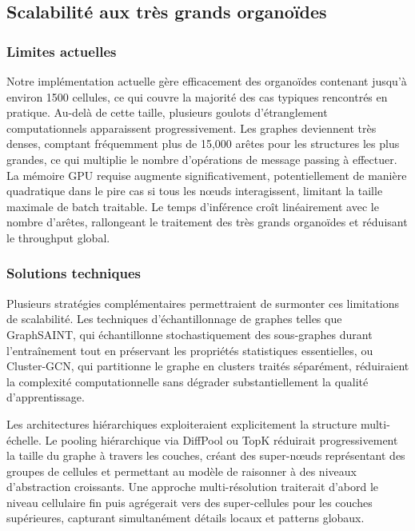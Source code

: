 \subsection{Scalabilité aux très grands organoïdes}

\subsubsection{Limites actuelles}

Notre implémentation actuelle gère efficacement des organoïdes contenant jusqu'à environ 1500 cellules, ce qui couvre la majorité des cas typiques rencontrés en pratique. Au-delà de cette taille, plusieurs goulots d'étranglement computationnels apparaissent progressivement. Les graphes deviennent très denses, comptant fréquemment plus de 15,000 arêtes pour les structures les plus grandes, ce qui multiplie le nombre d'opérations de message passing à effectuer. La mémoire GPU requise augmente significativement, potentiellement de manière quadratique dans le pire cas si tous les nœuds interagissent, limitant la taille maximale de batch traitable. Le temps d'inférence croît linéairement avec le nombre d'arêtes, rallongeant le traitement des très grands organoïdes et réduisant le throughput global.

\subsubsection{Solutions techniques}

Plusieurs stratégies complémentaires permettraient de surmonter ces limitations de scalabilité. Les techniques d'échantillonnage de graphes telles que GraphSAINT, qui échantillonne stochastiquement des sous-graphes durant l'entraînement tout en préservant les propriétés statistiques essentielles, ou Cluster-GCN, qui partitionne le graphe en clusters traités séparément, réduiraient la complexité computationnelle sans dégrader substantiellement la qualité d'apprentissage.

Les architectures hiérarchiques exploiteraient explicitement la structure multi-échelle. Le pooling hiérarchique via DiffPool ou TopK réduirait progressivement la taille du graphe à travers les couches, créant des super-nœuds représentant des groupes de cellules et permettant au modèle de raisonner à des niveaux d'abstraction croissants. Une approche multi-résolution traiterait d'abord le niveau cellulaire fin puis agrégerait vers des super-cellules pour les couches supérieures, capturant simultanément détails locaux et patterns globaux.

